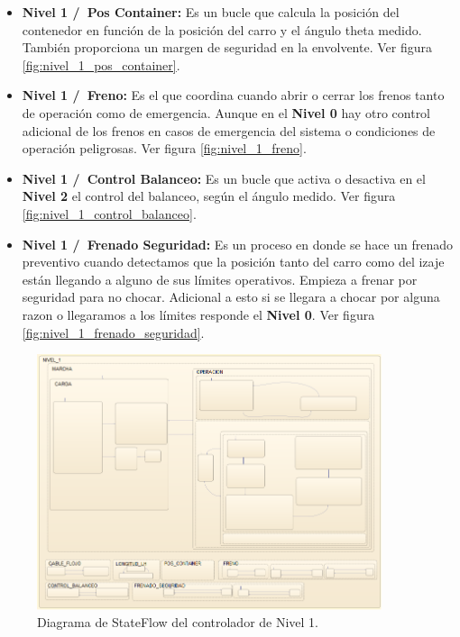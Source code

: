 \documentclass[11pt]{article}
\begin{document}
\begin{itemize}
	\item \textbf{Nivel 1 /\ Pos Container:} Es un bucle que calcula la posición del contenedor en función de la posición del carro y el ángulo theta medido. También proporciona un margen de seguridad en la envolvente. Ver figura \ref{fig:nivel_1_pos_container}.
	
	\item \textbf{Nivel 1 /\ Freno:} Es el que coordina cuando abrir o cerrar los frenos tanto de operación como de emergencia. Aunque en el \textbf{Nivel 0} hay otro control adicional de los frenos en casos de emergencia del sistema o condiciones de operación peligrosas. Ver figura \ref{fig:nivel_1_freno}.
	
	\item \textbf{Nivel 1 /\ Control Balanceo:} Es un bucle que activa o desactiva en el \textbf{Nivel 2} el control del balanceo, según el ángulo medido. Ver figura \ref{fig:nivel_1_control_balanceo}.
	
	\item \textbf{Nivel 1 /\ Frenado Seguridad:} Es un proceso en donde se hace un frenado preventivo cuando detectamos que la posición tanto del carro como del izaje están llegando a alguno de sus límites operativos. Empieza a frenar por seguridad para no chocar. Adicional a esto si se llegara a chocar por alguna razon o llegaramos a los límites responde el \textbf{Nivel 0}. Ver figura \ref{fig:nivel_1_frenado_seguridad}.
	
\end{itemize}

\begin{figure}[!h]
	\centering
	\includegraphics[width=0.9\textwidth]{images/stateflow_nivel_1/controlador_nivel1.png}
	\caption{Diagrama de StateFlow del controlador de Nivel 1.}
	\label{fig:nivel_1}
\end{figure}
\end{document}
